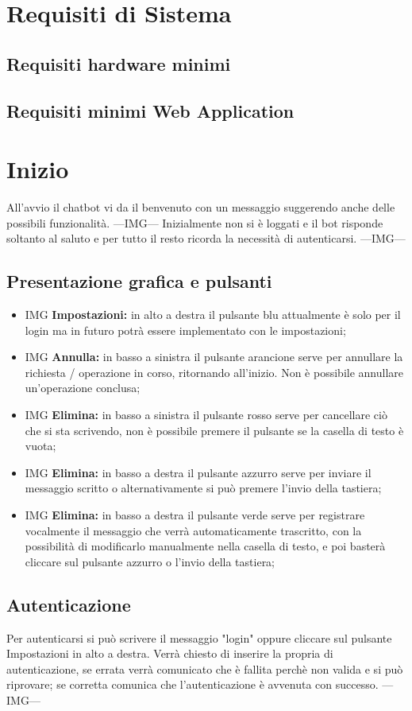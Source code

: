 \section{Requisiti di Sistema}
\subsection{Requisiti hardware minimi}
\subsection{Requisiti minimi Web Application}

\newpage
\section{Inizio}
All'avvio il chatbot vi da il benvenuto con un messaggio suggerendo anche delle possibili funzionalità.
---IMG--- \newline
Inizialmente non si è loggati e il bot risponde soltanto al saluto e per tutto il resto ricorda la necessità di autenticarsi.
---IMG--- \newline
\subsection{Presentazione grafica e pulsanti}
\begin{itemize}
    \item IMG \textbf{Impostazioni:} in alto a destra il pulsante blu attualmente è solo per il login ma in futuro potrà essere implementato con le impostazioni;
    \item IMG \textbf{Annulla:} in basso a sinistra il pulsante arancione serve per annullare la richiesta / operazione in corso, ritornando all'inizio. Non è possibile annullare un'operazione conclusa;
    \item IMG \textbf{Elimina:} in basso a sinistra il pulsante rosso serve per cancellare ciò che si sta scrivendo, non è possibile premere il pulsante se la casella di testo è vuota;
    \item IMG \textbf{Elimina:} in basso a destra il pulsante azzurro serve per inviare il messaggio scritto o alternativamente si può premere l'invio della tastiera;
    \item IMG \textbf{Elimina:} in basso a destra il pulsante verde serve per registrare vocalmente il messaggio che verrà automaticamente trascritto, con la possibilità di modificarlo manualmente nella casella di testo, e poi basterà cliccare sul pulsante azzurro o l'invio della tastiera; 
\end{itemize}
\subsection{Autenticazione}
Per autenticarsi si può scrivere il messaggio "login" oppure cliccare sul pulsante Impostazioni in alto a destra. Verrà chiesto di inserire la propria  di autenticazione, se errata verrà comunicato che è fallita perchè non valida e si può riprovare; se corretta comunica che l'autenticazione è avvenuta con successo. ---IMG--- \newline

\newpage